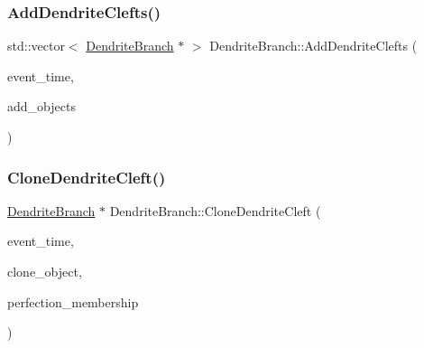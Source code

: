 \subsubsection{\texorpdfstring{Add\+Dendrite\+Clefts()}{AddDendriteClefts()}}
{\footnotesize\ttfamily std\+::vector$<$ \mbox{\hyperlink{classDendriteBranch}{Dendrite\+Branch}} $\ast$ $>$ Dendrite\+Branch\+::\+Add\+Dendrite\+Clefts (\begin{DoxyParamCaption}\item[{std\+::chrono\+::time\+\_\+point$<$ \mbox{\hyperlink{universe_8h_a0ef8d951d1ca5ab3cfaf7ab4c7a6fd80}{Clock}} $>$}]{event\+\_\+time,  }\item[{std\+::vector$<$ \mbox{\hyperlink{classDendriteBranch}{Dendrite\+Branch}} $\ast$$>$}]{add\+\_\+objects }\end{DoxyParamCaption})}

\mbox{\label{classDendriteBranch_a45d2fea350165fe0c81f1f429aa96061}} 
\subsubsection{\texorpdfstring{Clone\+Dendrite\+Cleft()}{CloneDendriteCleft()}}
{\footnotesize\ttfamily \mbox{\hyperlink{classDendriteBranch}{Dendrite\+Branch}} $\ast$ Dendrite\+Branch\+::\+Clone\+Dendrite\+Cleft (\begin{DoxyParamCaption}\item[{std\+::chrono\+::time\+\_\+point$<$ \mbox{\hyperlink{universe_8h_a0ef8d951d1ca5ab3cfaf7ab4c7a6fd80}{Clock}} $>$}]{event\+\_\+time,  }\item[{\mbox{\hyperlink{classDendriteBranch}{Dendrite\+Branch}} $\ast$}]{clone\+\_\+object,  }\item[{double}]{perfection\+\_\+membership }\end{DoxyParamCaption})}

\mbox{\label{classDendriteBranch_a3cf1e07fe5e0ea827965c0dc76881c9f}} 
